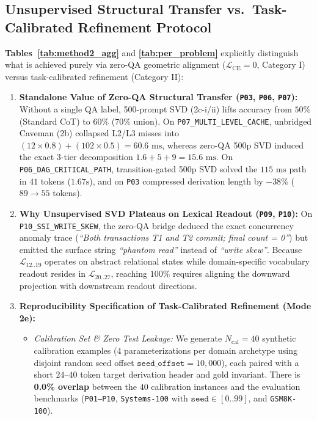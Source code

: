 \documentclass[10pt,twocolumn]{article}
\begin{document}
\subsection{Unsupervised Structural Transfer vs.\ Task-Calibrated Refinement Protocol}
\label{sec:calibration_protocol}
\textbf{Tables~\ref{tab:method2_agg}} and \textbf{\ref{tab:per_problem}} explicitly distinguish what is achieved purely via zero-QA geometric alignment ($\mathcal{L}_{\text{CE}} = 0$, Category I) versus task-calibrated refinement (Category II):
\begin{enumerate}
    \item \textbf{Standalone Value of Zero-QA Structural Transfer (\texttt{P03}, \texttt{P06}, \texttt{P07}):} Without a single QA label, 500-prompt SVD (2c-i/ii) lifts accuracy from $50\%$ (Standard CoT) to $60\%$ ($70\%$ union). On \texttt{P07\_MULTI\_LEVEL\_CACHE}, unbridged Caveman (2b) collapsed L2/L3 misses into $(12 \times 0.8) + (102 \times 0.5) = 60.6\text{ ms}$, whereas zero-QA 500p SVD induced the exact 3-tier decomposition $1.6 + 5 + 9 = 15.6\text{ ms}$. On \texttt{P06\_DAG\_CRITICAL\_PATH}, transition-gated 500p SVD solved the $115\text{ ms}$ path in $41$ tokens ($1.67\text{s}$), and on \texttt{P03} compressed derivation length by $-38\%$ ($89 \to 55$ tokens).
    \item \textbf{Why Unsupervised SVD Plateaus on Lexical Readout (\texttt{P09}, \texttt{P10}):} On \texttt{P10\_SSI\_WRITE\_SKEW}, the zero-QA bridge deduced the exact concurrency anomaly trace (\emph{``Both transactions T1 and T2 commit; final count = 0''}) but emitted the surface string \emph{``phantom read''} instead of \emph{``write skew''}. Because $\mathcal{L}_{12..19}$ operates on abstract relational states while domain-specific vocabulary readout resides in $\mathcal{L}_{20..27}$, reaching $100\%$ requires aligning the downward projection with downstream readout directions.
    \item \textbf{Reproducibility Specification of Task-Calibrated Refinement (Mode 2e):}
    \begin{itemize}
        \item \emph{Calibration Set \& Zero Test Leakage:} We generate $N_{\text{cal}} = 40$ synthetic calibration examples ($4$ parameterizations per domain archetype using disjoint random seed offset $\texttt{seed\_offset}=10,000$), each paired with a short $24\text{--}40$ token target derivation header and gold invariant. There is \textbf{0.0\% overlap} between the $40$ calibration instances and the evaluation benchmarks (\texttt{P01--P10}, \texttt{Systems-100} with $\texttt{seed} \in [0..99]$, and \texttt{GSM8K-100}).

\end{itemize}
\end{enumerate}
\end{document}
